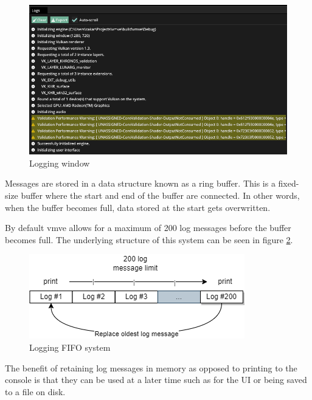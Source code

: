 \documentclass[11pt]{article}
\begin{document}
\begin{figure}[H]
  \centering
  \includegraphics[width=\textwidth]{images/logging_window.png}
  \caption{Logging window}
  \label{fig:logging_window}
\end{figure}

Messages are stored in a data structure known as a ring buffer. This is a
fixed-size buffer where the start and end of the buffer are connected. In other
words, when the buffer becomes full, data stored at the start gets overwritten.

By default \gls*{vmve} allows for a maximum of 200 log messages before the
buffer becomes full. The underlying structure of this system can be seen in
figure \ref{fig:logging_system}.

\begin{figure}[H]
  \centering
  \includegraphics[width=\textwidth]{images/logging.png}
  \caption{Logging FIFO system}
  \label{fig:logging_system}
\end{figure}

The benefit of retaining log messages in memory as opposed to printing to the
console is that they can be used at a later time such as for the UI or being
saved to a file on disk.
\end{document}
